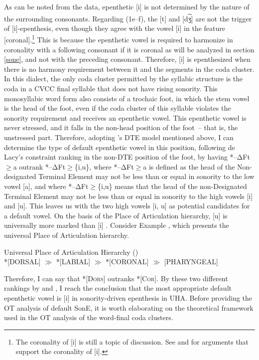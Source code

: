 \documentclass[output=paper,colorlinks,citecolor=brown]{langscibook}
\begin{document}
As can be noted from the data, epenthetic [i] is not determined by the nature of the surrounding consonants. Regarding (1e–f), the [t] and [d\textsuperscript{͡}ʒ] are not the trigger of [i]-epenthesis, even though they agree with the vowel [i] in the feature [coronal].\footnote{{The coronality of [i] is still a topic of discussion. See \citet{Clements1991} and \citet{Hume1992} for arguments that support the coronality of [i].} } This is because the epenthetic vowel is required to harmonize in coronality with a following consonant if it is coronal as will be analyzed in section \ref{sone}, and not with the preceding consonant. Therefore, [i] is epenthesized when there is no harmony requirement between it and the segments in the coda cluster. In this dialect, the only coda cluster permitted by  the syllabic structure is the coda in a CVCC final syllable that does not have rising sonority. This monosyllabic word form also consists of a trochaic foot, in which the stem vowel is the head of the foot, even if the coda cluster of this syllable violates the sonority requirement and receives an epenthetic vowel. This epenthetic vowel is never stressed, and it falls in the non-head position of the foot~-- that is, the unstressed part. Therefore, adopting \citeauthor{DeLacy2006}'s  DTE model mentioned above, I can determine the type of default epenthetic vowel in this position, following de Lacy’s constraint ranking in the non-DTE  position of the foot, by having *–ΔFt${\geq}$a outrank *–ΔFt${\geq}$\{i,u\}, where *–ΔFt${\geq}$a is defined as the head of the Non-designated Terminal Element may not be less than or equal in sonority to the low vowel [a], and where  *–ΔFt${\geq}$\{i,u\} means that the head of the non-Designated Terminal Element may not be less than or equal in sonority to the high vowels [i] and [u]. This leaves us with the two high vowels [i, u] as potential candidates for a default vowel. On the basis of the Place of Articulation hierarchy, [u] is universally more marked than [i] \citep{Lombardi1995}. Consider Example , which presents the universal Place of Articulation hierarchy.


\begin{exe} 
\ex \label{univ} Universal Place of Articulation Hierarchy (\cite{DeLacy2006})\\\relax
                 *[DORSAL]  $\gg$  *[LABIAL]  $\gg$  *[CORONAL]  $\gg$  [PHARYNGEAL]
\end{exe}

Therefore, I can say that *[\textsc{Dors}] outranks *[\textsc{Cor}]. By these two different rankings by \citeauthor{DeLacy2006} and \citeauthor{Lombardi1995}, I reach the conclusion that the most appropriate default epenthetic vowel is [i] in sonority-driven epenthesis in UHA. Before providing the OT analysis of default SonE, it is worth elaborating on the theoretical framework used in the OT analysis of the word-final coda clusters. 
\end{document}
